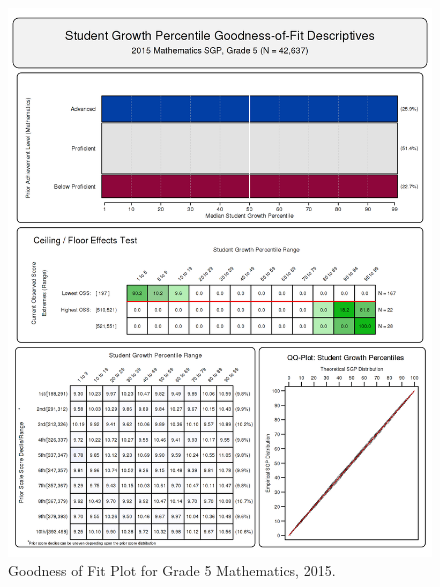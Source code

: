 \documentclass[12pt]{article}
\begin{document}
\begin{figure}[htbp]
\centering
\includegraphics{../img/Goodness_of_Fit/MATHEMATICS.2015/2015_MATH_5;2014_MATH_4;2013_MATH_3.png}
\caption{Goodness of Fit Plot for Grade 5 Mathematics, 2015.}
\end{figure}
\end{document}
